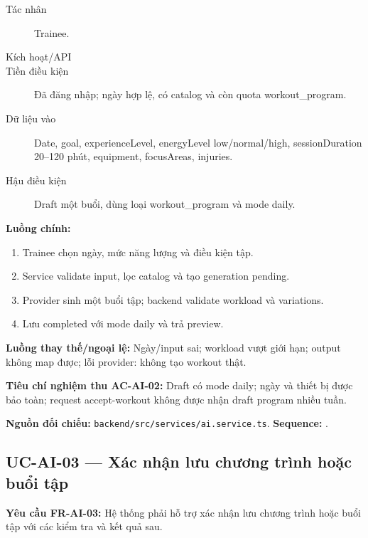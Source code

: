 \documentclass[12pt,a4paper]{article}
\newcommand{\evidence}[1]{{\small\nolinkurl{#1}}}
\begin{document}
\begin{description}
\item[Tác nhân] Trainee.
\item[Kích hoạt/API] 
\item[Tiền điều kiện] Đã đăng nhập; ngày hợp lệ, có catalog và còn quota workout\_program.
\item[Dữ liệu vào] Date, goal, experienceLevel, energyLevel low/normal/high, sessionDuration 20–120 phút, equipment, focusAreas, injuries.
\item[Hậu điều kiện] Draft một buổi, dùng loại workout\_program và mode daily.
\end{description}
\textbf{Luồng chính:}
\begin{enumerate}
  \item Trainee chọn ngày, mức năng lượng và điều kiện tập.
  \item Service validate input, lọc catalog và tạo generation pending.
  \item Provider sinh một buổi tập; backend validate workload và variations.
  \item Lưu completed với mode daily và trả preview.
\end{enumerate}
\textbf{Luồng thay thế/ngoại lệ:} Ngày/input sai; workload vượt giới hạn; output không map được; lỗi provider: không tạo workout thật.

\textbf{Tiêu chí nghiệm thu AC-AI-02:} Draft có mode daily; ngày và thiết bị được bảo toàn; request accept-workout không được nhận draft program nhiều tuần.

\textbf{Nguồn đối chiếu:} \evidence{backend/src/services/ai.service.ts}. \textbf{Sequence:} .

\subsection{UC-AI-03 --- Xác nhận lưu chương trình hoặc buổi tập}
\label{uc-ai-3}
\textbf{Yêu cầu FR-AI-03:} Hệ thống phải hỗ trợ xác nhận lưu chương trình hoặc buổi tập với các kiểm tra và kết quả sau.
\end{document}
